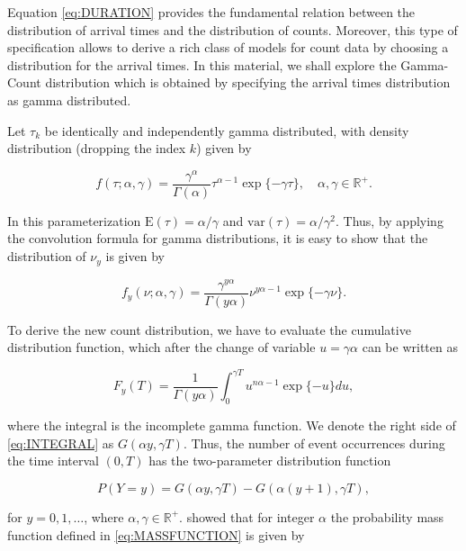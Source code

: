 \documentclass[9pt,a5paper,]{book}
\theoremstyle{definition}
\theoremstyle{definition}
\theoremstyle{remark}
\begin{document}
Equation \eqref{eq:DURATION} provides the fundamental relation between the
distribution of arrival times and the distribution of counts. Moreover,
this type of specification allows to derive a rich class of models for
count data by choosing a distribution for the arrival times. In this
material, we shall explore the Gamma-Count distribution which is
obtained by specifying the arrival times distribution as gamma
distributed.

Let \(\tau_k\) be identically and independently gamma distributed, with
density distribution (dropping the index \(k\)) given by

\begin{equation}
f(\tau; \alpha, \gamma) = \frac{\gamma^{\alpha}}{\Gamma(\alpha)} \tau^{\alpha-1} \exp\{-\gamma \tau\}, \quad \alpha, \gamma \in \mathbb{R}^{+}.
\end{equation}

In this parameterization \(\mathrm{E}(\tau) = \alpha/\gamma\) and
\(\mathrm{var}(\tau) = \alpha/\gamma^2\). Thus, by applying the
convolution formula for gamma distributions, it is easy to show that the
distribution of \(\nu_y\) is given by

\begin{equation}
f_y(\nu; \alpha, \gamma) = \frac{\gamma^{y\alpha}}{\Gamma(y\alpha)} \nu^{y\alpha-1} \exp\{-\gamma \nu\}.
\end{equation}

To derive the new count distribution, we have to evaluate the cumulative
distribution function, which after the change of variable
\(u = \gamma \alpha\) can be written as

\begin{equation}
F_y(T) = \frac{1}{\Gamma(y\alpha)} \int_0^{\gamma T} u^{n\alpha -1} \exp\{-u\} du,
\label{eq:INTEGRAL}
\end{equation}

where the integral is the incomplete gamma function. We denote the right
side of \eqref{eq:INTEGRAL} as \(G(\alpha y, \gamma T)\). Thus, the number
of event occurrences during the time interval \((0,T)\) has the
two-parameter distribution function

\begin{equation}
P(Y = y) = G(\alpha y, \gamma T) - G(\alpha (y + 1), \gamma T),
\label{eq:MASSFUNCTION}
\end{equation}

for \(y = 0, 1, \ldots\), where \(\alpha, \gamma \in \mathbb{R}^+\).
\citet{Winkelman1995} showed that for integer \(\alpha\) the probability
mass function defined in \eqref{eq:MASSFUNCTION} is given by
\end{document}
